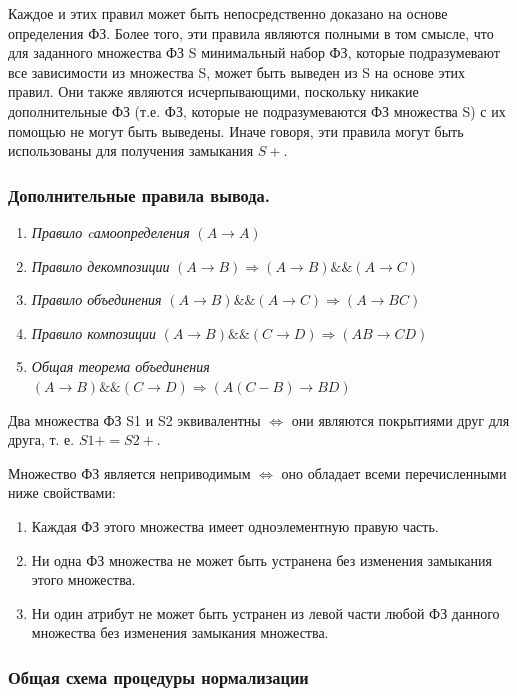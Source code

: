 Каждое и этих правил может быть непосредственно доказано на основе определения ФЗ. Более того, эти правила 
являются полными в том смысле, что для заданного множества ФЗ S минимальный набор ФЗ, которые подразумевают 
все зависимости из множества S, может быть выведен из S на основе этих правил. Они также являются 
исчерпывающими, поскольку никакие дополнительные ФЗ (т.е. ФЗ, которые не подразумеваются ФЗ множества S) с их 
помощью не могут быть выведены. Иначе говоря, эти правила могут быть использованы для получения замыкания $S+$.

\subsubsection{Дополнительные правила вывода.}

\begin{enumerate}
	\item \textit{Правило cамоопределения} $(A \to A)$
	\item \textit{Правило декомпозиции} $(A \to B) \Rightarrow (A \to B) \&\& (A \to C)$
	\item \textit{Правило объединения} $(A \to B) \&\& (A \to C) \Rightarrow (A \to BC)$
	\item \textit{Правило композиции} $(A \to B) \&\& (C \to D) \Rightarrow (AB \to CD)$
	\item \textit{Общая теорема объединения} $(A \to B) \&\& (C \to D) \Rightarrow (A(C - B) \to BD)$
\end{enumerate}

Два множества ФЗ S1 и S2 эквивалентны $\Leftrightarrow$ они являются покрытиями друг для друга, т. е. $S1+ = S2+$.

Множество ФЗ является неприводимым $\Leftrightarrow$ оно обладает всеми перечисленными ниже свойствами:
\begin{enumerate}
	\item Каждая ФЗ этого множества имеет одноэлементную правую часть.
	\item Ни одна ФЗ множества не может быть устранена без изменения замыкания этого множества.
	\item Ни один атрибут не может быть устранен из левой части любой ФЗ данного множества без изменения замыкания множества.
\end{enumerate}


\subsubsection{Общая схема процедуры нормализации}

